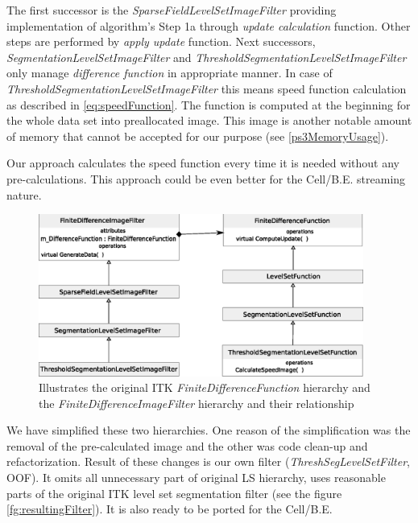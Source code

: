 \par
The first successor is the \mbox{\emph{SparseFieldLevelSetImageFilter}} providing implementation of algorithm's Step 1a through \emph{update calculation} function.
Other steps are performed by \emph{apply update} function.
Next successors, \mbox{\emph{SegmentationLevelSetImageFilter}} and \mbox{\emph{ThresholdSegmentationLevelSetImageFilter}} only manage \emph{difference function} in appropriate manner.
In case of \mbox{\emph{ThresholdSegmentationLevelSetImageFilter}} this means speed function calculation as described in \ref{eq:speedFunction}.
The function is computed at the beginning for the whole data set into preallocated image.
This image is another notable amount of memory that cannot be accepted for our purpose (see \ref{ps3MemoryUsage}).

\par
Our approach calculates the speed function every time it is needed without any pre-calculations.
This approach could be even better for the \mbox{Cell/B.E.} streaming nature.

\begin{figure}
    \centering
    \includegraphics[width=0.95\textwidth]{data/originalHierarchy}
    \caption[Original ITK thresholding level set filter class hierarchy]
{Illustrates the original ITK \mbox{\emph{FiniteDifferenceFunction}} hierarchy and the \mbox{\emph{FiniteDifferenceImageFilter}} hierarchy and their relationship}
    \label{fg:originalHierarchy}
\end{figure}

\par
We have simplified these two hierarchies.
One reason of the simplification was the removal of the pre-calculated image and the other was code clean-up and refactorization.
Result of these changes is our own filter (\mbox{\emph{ThreshSegLevelSetFilter}}, OOF).
It omits all unnecessary part of original LS hierarchy, uses reasonable parts of the original ITK level set segmentation filter (see the figure \ref{fg:resultingFilter}).
It is also ready to be ported for the \mbox{Cell/B.E.}

